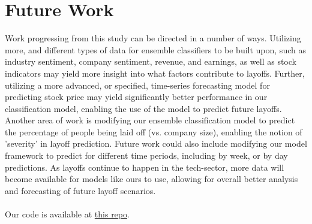 \documentclass[10pt]{article}
\begin{document}
%
% 
\section{Future Work}
Work progressing from this study can be directed in a number of ways. 
Utilizing more, and different types of data for ensemble classifiers 
to be built upon, such as industry sentiment, company sentiment, 
revenue, and earnings, as well as stock indicators may yield more 
insight into what factors contribute to layoffs. Further, utilizing 
a more advanced, or specified, time-series forecasting model for 
predicting stock price may yield significantly better performance in 
our classification model, enabling the use of the model to predict 
future layoffs. Another area of work is modifying our ensemble 
classification model to predict the percentage of people being laid 
off (vs. company size), enabling the notion of 'severity' in layoff 
prediction. Future work could also include modifying our model 
framework to predict for different time periods, including by week,
or by day predictions. As layoffs continue to happen in the 
tech-sector, more data will become available for models like ours to 
use, allowing for overall better analysis and forecasting of future 
layoff scenarios.
\\
\\
Our code is available at \href{https://github.com/shwaylay/CMSC828A_Final_Proj}{this repo}.


\end{document}
